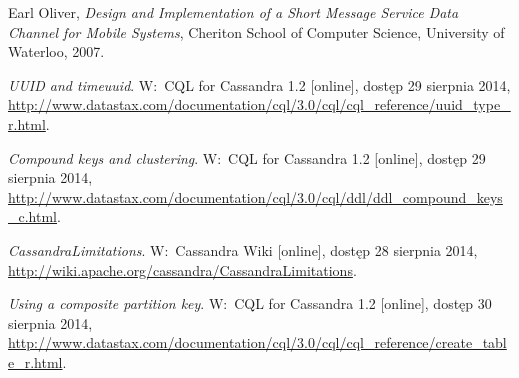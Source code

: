 \begin{thebibliography}{9}
Earl Oliver, \emph{Design and Implementation of a Short Message Service Data Channel for Mobile Systems}, Cheriton School of Computer Science, University of Waterloo, 2007.

\emph{UUID and timeuuid}. W:~CQL for Cassandra 1.2 [online], dostęp 29 sierpnia 2014, \url{http://www.datastax.com/documentation/cql/3.0/cql/cql\_reference/uuid\_type\_r.html}.

\emph{Compound keys and clustering}. W:~CQL for Cassandra 1.2 [online], dostęp 29 sierpnia 2014, \url{http://www.datastax.com/documentation/cql/3.0/cql/ddl/ddl\_compound\_keys\_c.html}.

\emph{CassandraLimitations}. W:~Cassandra Wiki [online], dostęp 28 sierpnia 2014, \url{http://wiki.apache.org/cassandra/CassandraLimitations}.

\emph{Using a composite partition key}. W:~CQL for Cassandra 1.2 [online], dostęp 30 sierpnia 2014, \url{http://www.datastax.com/documentation/cql/3.0/cql/cql\_reference/create\_table\_r.html}.

\end{thebibliography}
